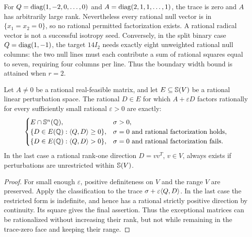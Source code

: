 \begin{remark}
For $Q=\operatorname{diag}(1,-2,0,\ldots,0)$ and $A=\operatorname{diag}(2,1,1,\ldots,1)$, the trace is zero and $A$ has arbitrarily large rank. Nevertheless every rational null vector is in $\{x_1=x_2=0\}$, so no rational permitted factorization exists. A rational radical vector is not a successful isotropy seed. Conversely, in the split binary case $Q=\operatorname{diag}(1,-1)$, the target $14I_2$ needs exactly eight unweighted rational null columns: the two null lines must each contribute a sum of rational squares equal to seven, requiring four columns per line. Thus the boundary width bound is attained when $r=2$.
\end{remark}

\begin{corollary}\label{cor:directions}
Let $A\ne0$ be a rational real-feasible matrix, and let $E\subseteq\mathbb S(V)$ be a rational linear perturbation space. The rational $D\in E$ for which $A+\varepsilon D$ factors rationally for every sufficiently small rational $\varepsilon>0$ are exactly:
\[
 \begin{cases}
 E\cap\mathbb S^n(\mathbb Q),&\sigma>0,\\
 \{D\in E(\mathbb Q):\langle Q,D\rangle\geq0\},&\sigma=0\text{ and rational factorization holds},\\
 \{D\in E(\mathbb Q):\langle Q,D\rangle>0\},&\sigma=0\text{ and rational factorization fails}.
 \end{cases}
\]
In the last case a rational rank-one direction $D=vv^T$, $v\in V$, always exists if perturbations are unrestricted within $\mathbb S(V)$.
\end{corollary}
\begin{proof}
For small enough $\varepsilon$, positive definiteness on $V$ and the range $V$ are preserved. Apply the classification to the trace $\sigma+\varepsilon\langle Q,D\rangle$. In the last case the restricted form is indefinite, and hence has a rational strictly positive direction by continuity. Its square gives the final assertion. Thus the exceptional matrices can be rationalized without increasing their rank, but not while remaining in the trace-zero face and keeping their range.
\end{proof}
